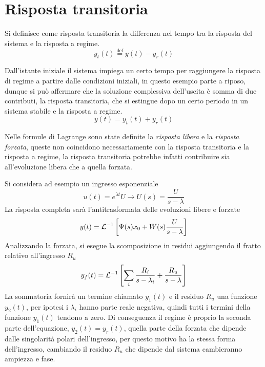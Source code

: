 \newpage
\section{Risposta transitoria}
Si definisce come risposta transitoria la differenza nel tempo tra la risposta
del sistema e la risposta a regime.
$$
y_t(t) \stackrel{\text{def}}{=} y(t) - y_r(t)
$$
\begin{figure}[h]
 \centering

\end{figure}
Dall'istante iniziale il sistema impiega un certo tempo per raggiungere la
risposta di regime a partire dalle condizioni iniziali, in questo esempio
parte a riposo, dunque si può affermare che la soluzione complessiva
dell'uscita è somma di due contributi, la risposta transitoria, che si estingue
dopo un certo periodo in un sistema stabile e la risposta a regime.
$$
y(t) = y_t(t) + y_r(t)
$$

Nelle formule di Lagrange sono state definite la \textit{risposta libera} e la
\textit{risposta forzata}, queste non coincidono necessariamente con la
risposta transitoria e la risposta a regime, la risposta transitoria potrebbe
infatti contribuire sia all'evoluzione libera che a quella forzata.

Si considera ad esempio un ingresso esponenziale
$$
u(t) = e^{\lambda t} U \longrightarrow U(s) = \frac{U}{s-\lambda}
$$
La risposta completa sarà l'antitrasformata delle evoluzioni libere e forzate
$$
y(t) = \mathcal{L}^{-1} \left[ \Psi(s)x_0 + W(s)\frac{U}{s-\lambda}  \right]
$$
Analizzando la forzata, si esegue la scomposizione in residui aggiungendo il
fratto relativo all'ingresso $R_u$
$$
y_f(t) = \mathcal{L}^{-1}\left[\sum_i \frac{R_i}{s-\lambda_i} +
\frac{R_u}{s-\lambda}\right]
$$
La sommatoria fornirà un termine chiamato $y_1(t)$ e il residuo $R_u$ una
funzione $y_2(t)$, per ipotesi i $\lambda_i$ hanno parte reale negativa, quindi
tutti i termini della funzione $y_1(t)$ tendono a zero.
Di conseguenza il regime è proprio la seconda parte dell'equazione,
$y_2(t)=y_r(t)$, quella parte della forzata che dipende dalle singolarità
polari dell'ingresso, per questo motivo ha la stessa forma dell'ingresso,
cambiando il residuo $R_u$ che dipende dal sistema cambieranno ampiezza e fase.

